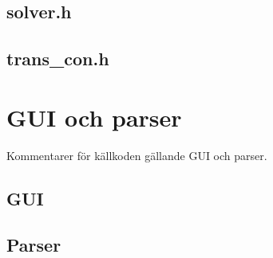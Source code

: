 \newpage

\subsection{solver.h}


\newpage

\subsection{trans\_con.h}


\newpage
\section{GUI och parser}
Kommentarer för källkoden gällande GUI och parser.

\subsection{GUI}


\newpage

\subsection{Parser}


